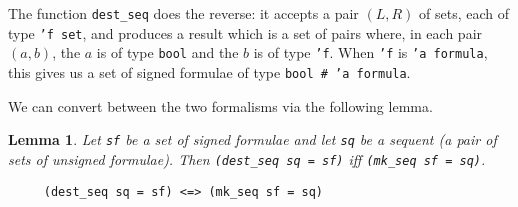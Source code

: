 \documentclass[a4paper]{article}
\newtheorem{lemma}{Lemma}
\begin{document}


The function \texttt{dest\_seq} does the reverse: it accepts a pair
$(L,R)$ of sets, each of type \texttt{'f set}, and
produces a result which is a set of pairs where, in each pair $(a,b)$,
the $a$ is of type \texttt{bool} and the $b$ is of type \texttt{'f}. 
When \texttt{'f} is \texttt{'a formula}, this gives us a 
set of signed formulae of type \texttt{bool \# 'a formula}.




We can convert between the two formalisms via the following lemma.
\begin{lemma}
Let \texttt{sf} be a set of signed formulae and let \texttt{sq} be a
sequent (a pair of sets of unsigned formulae). Then 
\texttt{(dest\_seq sq = sf)} iff \texttt{(mk\_seq sf = sq)}.
\begin{verbatim}
     (dest_seq sq = sf) <=> (mk_seq sf = sq)
\end{verbatim}
\end{lemma}
\end{document}
